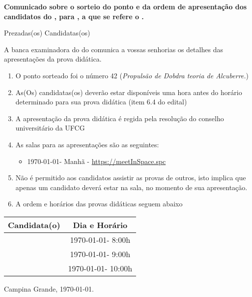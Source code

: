 \documentclass[12pt]{uaefata}
\date{} %
\begin{document}
\begin{letter}{
		\textbf{Comunicado sobre o sorteio do ponto e da ordem de apresentação dos candidatos do \concurso, para \cargo,  a que se refere o \edital.}
	}
 
\opening{Prezadas(os) Candidatas(os)}

A banca examinadora do \concurso do \edital comunica a vossas senhorias os detalhes das apresentações da prova didática. 
\begin{enumerate}
	\item O ponto sorteado foi o número 42 (\textit{Propulsão de Dobdra teoria de Alcuberre.})
	\item As(Os) candidatas(os) deverão estar disponíveis uma hora antes do horário determinado para sua prova didática (item 6.4 do edital)
	\item A apresentação da prova didática é regida pela resolução \resconc do conselho universitário da UFCG
	\item As salas para as apresentações são as seguintes:
		\begin{itemize}
			\item \today - Manhã - \href{https://meetInSpace.spc}{https://meetInSpace.spc}
		\end{itemize}
	\item Não é permitido aos candidatos assistir as provas de outros, isto implica que apenas um candidato deverá estar na sala, no momento de sua apresentação.
	\item A ordem  e horários das provas didáticas seguem abaixo
\end{enumerate}
\centering

\begin{tabular}{|l|c|}
	\hline
	\textbf{Candidata(o)} & \textbf{Dia e Horário}\\
	\hline
	\cdta & \today - 8:00h\\
	\cdtb & \today - 9:00h \\
	\cdtc & \today - 10:00h \\
	\hline
\end{tabular} 



\closing{Campina Grande, \today.}




\end{letter}
\end{document}
